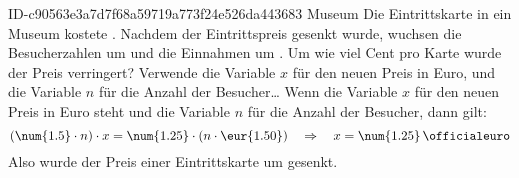 \begin{exercise}
      {ID-c90563e3a7d7f68a59719a773f24e526da443683}
      {Museum}
  \ifproblem\problem
    Die Eintrittskarte in ein Museum kostete . Nachdem der Eintrittspreis
    gesenkt wurde, wuchsen die Besucherzahlen um  und die Einnahmen um .
    Um wie viel Cent pro Karte wurde der Preis verringert?
  \fi
  \ifoutline\outline
    Verwende die Variable $x$ für den neuen Preis in Euro, und die Variable $n$ für
    die Anzahl der Besucher\ldots
  \fi
  \ifoutcome\outcome
    Wenn die Variable $x$ für den neuen Preis in Euro steht und die Variable $n$ für
    die Anzahl der Besucher, dann gilt:
    \begin{equation*}
      (\num{1.5}\cdot n)\cdot x=\num{1.25}\cdot(n\cdot\eur{1.50})
      \quad\Rightarrow\quad
      x=\num{1.25}\,\text{\officialeuro}
    \end{equation*}
    Also wurde der Preis einer Eintrittskarte um  gesenkt.
  \fi
\end{exercise}
